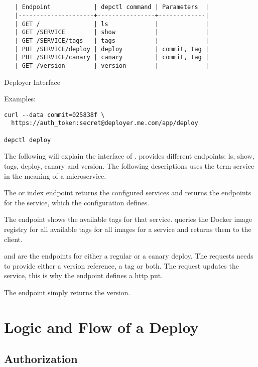 \begin{table}[!htbp]
\begin{verbatim}


   | Endpoint            | depctl command | Parameters  |
   |---------------------+----------------+-------------|
   | GET /               | ls             |             |
   | GET /SERVICE        | show           |             |
   | GET /SERVICE/tags   | tags           |             |
   | PUT /SERVICE/deploy | deploy         | commit, tag |
   | PUT /SERVICE/canary | canary         | commit, tag |
   | GET /version        | version        |             |

\end{verbatim}
\caption{Deployer Interface}
\label{tab:interface}
\end{table}
Examples:
\begin{verbatim}
curl --data commit=025838f \
  https://auth_token:secret@deployer.me.com/app/deploy

depctl deploy
\end{verbatim}

The following will explain the interface of \deployer{}. \deployer{} provides different
endpoints: ls, show, tags, deploy, canary and version. The following descriptions uses the
term service in the meaning of a microservice.

The  or index endpoint returns the configured services and returns the endpoints
for the service, which the configuration defines.

The  endpoint shows the available tags for that service. \deployer{} queries the
Docker image registry for all available tags for all images for a service and returns them
to the client.

 and  are the endpoints for either a regular or a canary
deploy. The requests needs to provide either a version reference, a tag or both. The
request updates the service, this is why the endpoint defines a \gls{http} put.

The  endpoint simply returns the \deployer{} version.

\section{Logic and Flow of a Deploy}

\subsection{Authorization}

